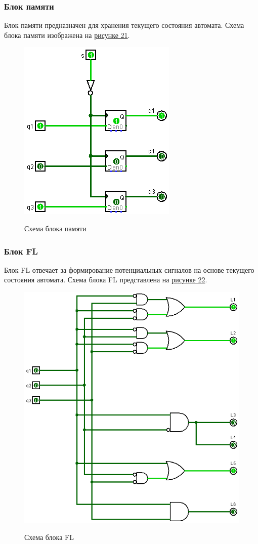 \documentclass[10pt,a4paper,final]{article} %
\begin{document}
\newpage
\subsubsection{Блок памяти}
Блок памяти предназначен для хранения текущего состояния автомата. Схема блока памяти изображена на \hyperref[memory]{рисунке 21}.
\begin{figure}[htpb]
	\centering
	\includegraphics[scale=0.4]{logisim/img/memory.png}
	\label{memory} 
	\caption{Схема блока памяти}
\end{figure}



\subsubsection{Блок FL}
Блок FL отвечает за формирование потенциальных сигналов на основе  текущего состояния автомата. Схема блока FL представлена на \hyperref[FL-block]{рисунке 22}.
\begin{figure}[htpb]
	\centering
	\includegraphics[scale=0.4]{logisim/img/FL.png}
	\label{FL-block} 
	\caption{Схема блока FL}
\end{figure}
\end{document}
